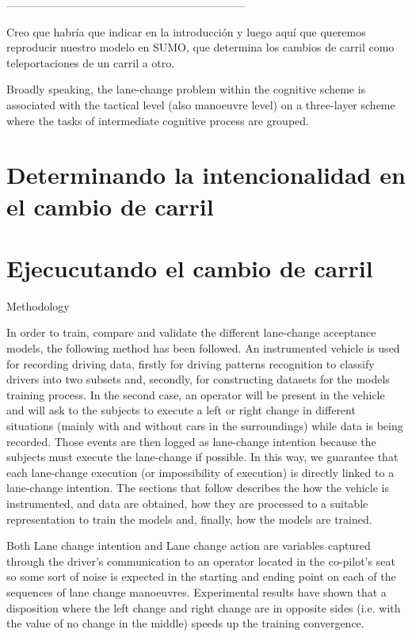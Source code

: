 -----------------------------------------------------------------

\TODO Creo que habría que indicar en la introducción y luego aquí que queremos reproducir nuestro modelo en SUMO, que determina los cambios de carril como teleportaciones de un carril a otro.

Broadly speaking, the lane-change problem within the cognitive scheme is associated with the tactical level (also manoeuvre level) on a three-layer scheme where the tasks of intermediate cognitive process are grouped.



\section{Determinando la intencionalidad en el cambio de carril}
\label{s:lane-change-intention}

\section{Ejecucutando el cambio de carril}
\label{s:lane-change-execution}


Methodology

In order to train, compare and validate the different lane-change acceptance models, the following method has been followed. An instrumented vehicle is used for recording driving data, firstly for driving patterns recognition to classify drivers into two subsets and, secondly, for constructing datasets for the models training process. In the second case, an operator will be present in the vehicle and will ask to the subjects to execute a left or right change in different situations (mainly with and without cars in the surroundings) while data is being recorded. Those events are then logged as lane-change intention because the subjects must execute the lane-change if possible. In this way, we guarantee that each lane-change execution (or impossibility of execution) is directly linked to a lane-change intention.
The sections that follow describes the how the vehicle is instrumented, and data are obtained, how they are processed to a suitable representation to train the models and, finally, how the models are trained.

Both Lane change intention and Lane change action are variables captured through the driver’s communication to an operator located in the co-pilot’s seat so some sort of noise is expected in the starting and ending point on each of the sequences of lane change manoeuvres. Experimental results have shown that a disposition where the left change and right change are in opposite sides (i.e. with the value of no change in the middle) speeds up the training convergence.


